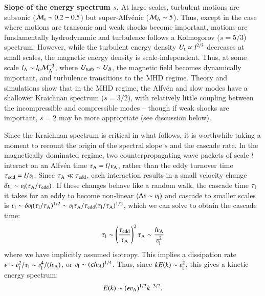 \documentclass[fleqn,usenatbib,useAMS]{mnras}
\begin{document}
{\bf Slope of the energy spectrum $s$.} At large scales, turbulent motions are subsonic (${\mathcal M}_{\rm s} \sim 0.2-0.5$) but super-Alfv{\'e}nic (${\mathcal M}_{\rm A} \sim 5$). Thus, except in the case where motions are transonic and weak shocks become important, motions are fundamentally hydrodynamic and turbulence follows a Kolmogorov ($s=5/3$) spectrum. However, while the turbulent energy density $U_{\rm t} \propto l^{2/3}$ decreases at small scales, the magnetic energy density is scale-independent. Thus, at some scale $l_{\rm A} \sim l_{\rm o} {\mathcal M}_{\rm A}^{-3}$, where $U_{\rm turb} \sim U_{B}$, the magnetic field becomes dynamically important, and turbulence transitions to the MHD regime. Theory \citep{goldreich95,chandran05} and simulations \citep{cho03} show that in the MHD regime, the Alfv{\'e}n and slow modes have a shallower Kraichnan spectrum ($s=3/2$), with relatively little coupling between the incompressible and compressible modes \citep{cho02,cho03} -- though if weak shocks are important, $s=2$ may be more appropriate (see discussion below). 

Since the Kraichnan spectrum is critical in what follows, it is worthwhile taking a moment to recount the origin of the spectral slope $s$ and the cascade rate. In the magnetically dominated regime, two counterpropagating wave packets of scale $l$ interact on an Alfv{\'e}n time $\tau_{\rm A}=l/\varv_{\rm A}$, rather than the eddy turnover time $\tau_{\rm edd} = l/\varv_{\rm l}$. 
Since $\tau_{\rm A} \ll \tau_{\rm edd}$, each interaction results in a small velocity change $\delta \varv_{\rm l} \sim \varv_{\rm l} (\tau_{\rm A}/\tau_{\rm edd})$. If these changes behave like a random walk, the cascade time $\tau_{\rm l}$ it takes for an eddy to become non-linear ($\Delta \varv \sim \varv_{\rm l})$ and cascade to smaller scales is $\varv_{\rm l} \sim \delta \varv_{\rm l} (\tau_{\rm l}/\tau_{\rm A})^{1/2} \sim \varv_{\rm l} \tau_{\rm A}/\tau_{\rm edd} (\tau_{\rm l}/\tau_{\rm A})^{1/2}$, which we can solve to obtain the cascade time: 
\begin{equation}
\tau_{\rm l} \sim \left(\frac{\tau_{\rm edd}}{\tau_{\rm A}}\right)^{2} \tau_{\rm A} \sim \frac{l \varv_{\rm A}}{\varv_{\rm l}^{2}} 
\end{equation}
where we have implicitly assumed isotropy. This implies a dissipation rate $\epsilon \sim \varv_{\rm l}^{2}/\tau_{\rm l} \sim \varv_{\rm l}^{4}/(l \varv_{\rm A})$, or $\varv_{\rm l} \sim (\epsilon l \varv_{A})^{1/4}$. Thus, since $k E(k)\sim \varv_{\rm l}^{2}$, this gives a kinetic energy spectrum: 
\begin{equation}
E(k) \sim (\epsilon \varv_{\rm A})^{1/2} k^{-3/2}.
\end{equation}
 
\end{document}
